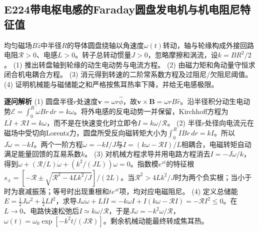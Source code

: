 \subsection*{E224\quad 带电枢电感的Faraday圆盘发电机与机电阻尼特征值}
均匀磁场$B\hat z$中半径$R$的导体圆盘绕轴以角速度$\omega(t)$转动，轴与轮缘构成外接回路电阻$\mathcal R>0$、电感$L>0$。转子总转动惯量$J>0$，忽略摩擦和涡流，设$k=BR^2/2$。
(1) 推出转盘轴到轮缘的动生电动势与电流方程。
(2) 由磁力矩和角动量守恒求闭合机电耦合方程。
(3) 消元得到转速的二阶常系数方程及过阻尼/欠阻尼阈值。
(4) 证明机械能与磁储能之和严格按焦耳热率下降，并给无电感极限。
\par\textbf{逐问解析}
(1) 圆盘半径$r$处速度$\boldsymbol v=\omega r\hat\phi$，故$\boldsymbol v\times\boldsymbol B=\omega rB\hat r$。沿半径积分动生电动势$\mathcal E=\int_0^R\omega Br\,dr=k\omega$。将外电感的反电动势一并保留，Kirchhoff方程为$L\dot I+\mathcal RI=k\omega$，而不是在快速变化时立即令$I=k\omega/\mathcal R$。
(2) 半径$r$处径向电流元在磁场中受切向Lorentz力，圆盘所受反向磁转矩大小为$\int_0^R IBr\,dr=kI$。所以$J\dot\omega=-kI$。两个一阶方程$\dot\omega=-kI/J$与$\dot I=(k\omega-\mathcal RI)/L$相耦合，电磁转矩自动满足能量回馈的互易系数$k$。
(3) 对机械方程求导并用电路方程消去$I=-J\dot\omega/k$，得到$\ddot\omega+(\mathcal R/L)\dot\omega+(k^2/(JL))\omega=0$。指数模$e^{st}$的特征根$s_\pm=[-\mathcal R\pm\sqrt{\mathcal R^2-4Lk^2/J}]/(2L)$。当$\mathcal R^2>4Lk^2/J$时为两个负实根；当小于时为衰减振荡；等号时出现重根和$t e^{st}$项，均对应电磁阻尼。
(4) 定义总储能$E=\tfrac12J\omega^2+\tfrac12LI^2$，求导$J\omega\dot\omega+LI\dot I=-k\omega I+I(k\omega-\mathcal RI)=-\mathcal RI^2\le0$。在$L\to0$、电路快速松弛后$I\simeq k\omega/\mathcal R$，于是$J\dot\omega=-k^2\omega/\mathcal R$，$\omega(t)=\omega_0\exp[-k^2t/(J\mathcal R)]$。剩余机械动能最终转成焦耳热。
\par\medskip
